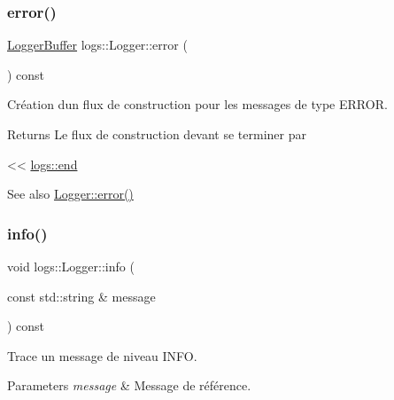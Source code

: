\subsubsection{\texorpdfstring{error()}{error()}\hspace{0.1cm}{\footnotesize\ttfamily [2/2]}}
{\footnotesize\ttfamily \hyperlink{classlogs_1_1Logger_1_1LoggerBuffer}{Logger\+Buffer} logs\+::\+Logger\+::error (\begin{DoxyParamCaption}{ }\end{DoxyParamCaption}) const\hspace{0.3cm}{\ttfamily [inline]}}



Création d\textquotesingle{}un flux de construction pour les messages de type E\+R\+R\+OR. 

\begin{DoxyReturn}{Returns}
Le flux de construction devant se terminer par
\begin{DoxyCode}
<< \hyperlink{Logger_8hpp_ac6f325c6cfe6189bc8e243daa184453b}{logs::end} 
\end{DoxyCode}
 
\end{DoxyReturn}
\begin{DoxySeeAlso}{See also}
\hyperlink{classlogs_1_1Logger_a8b6a2019233bc44b3c3c86c653910831}{Logger\+::error()} 
\end{DoxySeeAlso}
\mbox{\label{classlogs_1_1Logger_aa381165771d00a6a1e3aa9664bf6467f}} 
\subsubsection{\texorpdfstring{info()}{info()}\hspace{0.1cm}{\footnotesize\ttfamily [1/2]}}
{\footnotesize\ttfamily void logs\+::\+Logger\+::info (\begin{DoxyParamCaption}\item[{const std\+::string \&}]{message }\end{DoxyParamCaption}) const\hspace{0.3cm}{\ttfamily [inline]}}



Trace un message de niveau I\+N\+FO. 


\begin{DoxyParams}{Parameters}
{\em message} & Message de référence. \\
\hline
\end{DoxyParams}
\mbox{\label{classlogs_1_1Logger_abe904448829b4235e8452cbd19b35f45}} 
